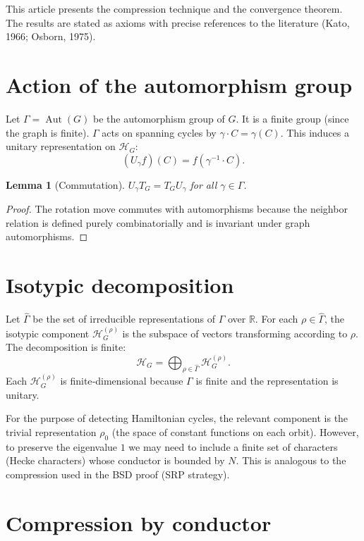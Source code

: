 \documentclass[11pt,a4paper]{article}
\newtheorem{lemma}[theorem]{Lemma}
\begin{document}
This article presents the compression technique and the convergence theorem. The results are stated as axioms with precise references to the literature (Kato, 1966; Osborn, 1975).

\section{Action of the automorphism group}

Let \(\Gamma = \operatorname{Aut}(G)\) be the automorphism group of \(G\). It is a finite group (since the graph is finite). \(\Gamma\) acts on spanning cycles by \( \gamma \cdot C = \gamma(C) \). This induces a unitary representation on \(\mathcal{H}_G\):
\[
(U_\gamma f)(C) = f(\gamma^{-1} \cdot C).
\]

\begin{lemma}[Commutation]
\(U_\gamma T_G = T_G U_\gamma\) for all \(\gamma \in \Gamma\).
\end{lemma}
\begin{proof}
The rotation move commutes with automorphisms because the neighbor relation is defined purely combinatorially and is invariant under graph automorphisms.
\end{proof}

\section{Isotypic decomposition}

Let \(\widehat{\Gamma}\) be the set of irreducible representations of \(\Gamma\) over \(\mathbb{R}\). For each \(\rho \in \widehat{\Gamma}\), the isotypic component \(\mathcal{H}_G^{(\rho)}\) is the subspace of vectors transforming according to \(\rho\). The decomposition is finite:
\[
\mathcal{H}_G = \bigoplus_{\rho \in \widehat{\Gamma}} \mathcal{H}_G^{(\rho)}.
\]
Each \(\mathcal{H}_G^{(\rho)}\) is finite‑dimensional because \(\Gamma\) is finite and the representation is unitary.

For the purpose of detecting Hamiltonian cycles, the relevant component is the trivial representation \(\rho_0\) (the space of constant functions on each orbit). However, to preserve the eigenvalue \(1\) we may need to include a finite set of characters (Hecke characters) whose conductor is bounded by \(N\). This is analogous to the compression used in the BSD proof (SRP strategy).

\section{Compression by conductor}
\end{document}
